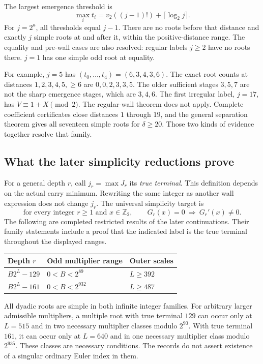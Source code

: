 The largest emergence threshold is
\[
 \max_i t_i=v_2((j-1)!)+\lceil\log_2 j\rceil.
\]
For $j=2^a$, all thresholds equal $j-1$. There are no roots before
that distance and exactly $j$ simple roots at and after it, within the
positive-distance range. The equality and pre-wall cases are also
resolved: regular labels $j\ge2$ have no roots there. $j=1$ has one
simple odd root at equality.

For example, $j=5$ has $(t_0,\ldots,t_4)=(6,3,4,3,6)$.
The exact root counts at distances $1,2,3,4,5,\ge6$ are
$0,0,2,3,3,5$. The older sufficient stages $3,5,7$ are not the
sharp emergence stages, which are $3,4,6$.
The first irregular label, $j=17$, has $V\equiv1+X\pmod2$.
The regular-wall theorem does not apply. Complete coefficient
certificates close distances $1$ through $19$, and the general separation
theorem gives all seventeen simple roots for $\delta\ge20$.
Those two kinds of evidence together resolve that family.

\subsection{What the later simplicity reductions prove}
\label{app:root:families}

For a general depth $r$, call $j_r=\max J_r$ its \emph{true terminal}.
This definition depends on the actual carry minimum. Rewriting the same
integer as another wall expression does not change $j_r$.
The universal simplicity target is
\begin{equation}
 \text{for every integer }r\ge1\text{ and }x\in\mathbb Z_2,
 \qquad G_r(x)=0\ \Longrightarrow\ G_r'(x)\ne0.
 \label{eq:root:simplicitytarget}
\end{equation}
The following are completed restricted results of the later continuations.
Their family statements include a proof that the indicated label is the
true terminal throughout the displayed ranges.

\begin{center}
\begin{tabular}{lll}
\toprule
Depth $r$ & Odd multiplier range & Outer scales\\
\midrule
$B2^L-129$ & $0<B<2^{89}$ & $L\ge392$\\
$B2^L-161$ & $0<B<2^{932}$ & $L\ge487$\\
\bottomrule
\end{tabular}
\end{center}
All dyadic roots are simple in both infinite integer families.
For arbitrary larger admissible multipliers, a multiple root with true
terminal $129$ can occur only at $L=515$ and in two necessary multiplier
classes modulo $2^{90}$. With true terminal $161$, it can occur only at
$L=640$ and in one necessary multiplier class modulo $2^{935}$.
These classes are necessary conditions. The records do not assert
existence of a singular ordinary Euler index in them.


